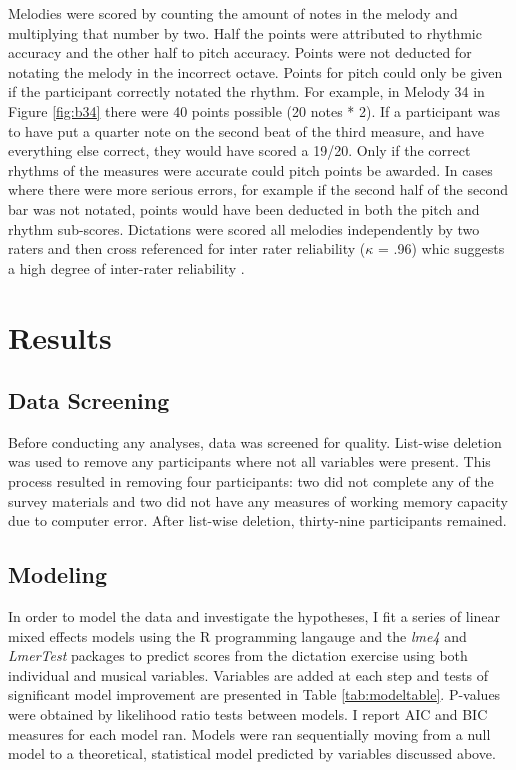 \documentclass[12pt,]{book}
\begin{document}
Melodies were scored by counting the amount of notes in the melody and multiplying that number by two.
Half the points were attributed to rhythmic accuracy and the other
half to pitch accuracy.
Points were not deducted for notating the melody in the incorrect octave.
Points for pitch could only be given if the participant correctly notated the rhythm.
For example, in Melody 34 in Figure \ref{fig:b34} there were 40 points possible (20 notes * 2).
If a participant was to have put a quarter note on the second beat of the third measure, and have everything else correct, they would have scored a 19/20.
Only if the correct rhythms of the measures were accurate could pitch points be
awarded.
In cases where there were more serious errors, for example if the second half of the second bar was not notated, points would have been deducted in both the pitch and rhythm sub-scores.
Dictations were scored all melodies independently by two raters and then cross referenced for inter rater reliability (\(\kappa\) = .96) whic suggests a high degree of inter-rater reliability \citep{kooGuidelineSelectingReporting2016}.

\hypertarget{results-1}{%
\section{Results}\label{results-1}}

\hypertarget{data-screening}{%
\subsection{Data Screening}\label{data-screening}}

Before conducting any analyses, data was screened for quality.
List-wise deletion was used to remove any participants where not all variables were present.
This process resulted in removing four participants: two did not complete any of the survey materials and two did not have any measures of working memory capacity due to computer error.
After list-wise deletion, thirty-nine participants remained.

\hypertarget{modeling-1}{%
\subsection{Modeling}\label{modeling-1}}

In order to model the data and investigate the hypotheses, I fit a series of linear mixed effects models using the R programming langauge \citep{R-base} and the \emph{lme4} and \emph{LmerTest} \citep{batesFittingLinearMixedEffects2015, lmerTest} packages to predict scores from the dictation exercise using both individual and musical variables.
Variables are added at each step and tests of significant model improvement are presented in Table \ref{tab:modeltable}.
P-values were obtained by likelihood ratio tests between models.
I report AIC and BIC measures for each model ran.
Models were ran sequentially moving from a null model to a theoretical, statistical model predicted by variables discussed above.
\end{document}
